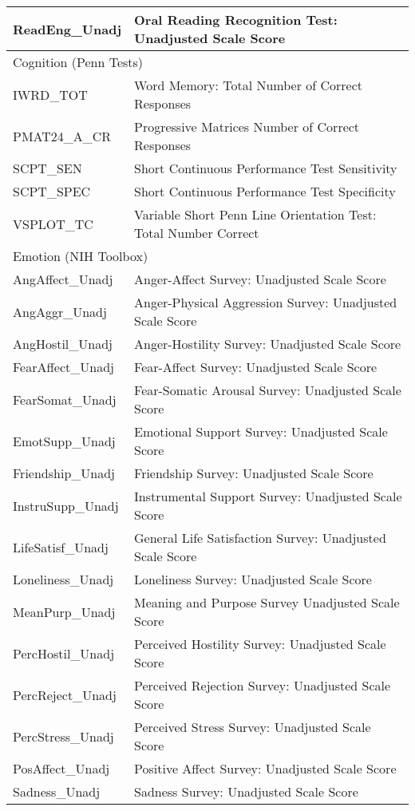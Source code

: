 \documentclass{article}
\begin{document}
\begin{longtable}{ll}
ReadEng\_Unadj & Oral Reading Recognition Test: Unadjusted Scale Score\\
\midrule
\multicolumn{2}{l}{Cognition (Penn Tests)}\\
\midrule
IWRD\_TOT & Word Memory: Total Number of Correct Responses\\
PMAT24\_A\_CR & Progressive Matrices\: Number of Correct Responses\\
SCPT\_SEN & Short Continuous Performance Test\: Sensitivity\\
SCPT\_SPEC & Short Continuous Performance Test\: Specificity\\
VSPLOT\_TC & Variable Short Penn Line Orientation Test: Total Number Correct \\
\midrule
\multicolumn{2}{l}{Emotion (NIH Toolbox)}\\
\midrule
AngAffect\_Unadj & Anger-Affect Survey: Unadjusted Scale Score\\
AngAggr\_Unadj & Anger-Physical Aggression Survey: Unadjusted Scale Score\\
AngHostil\_Unadj & Anger-Hostility Survey: Unadjusted Scale Score\\
FearAffect\_Unadj & Fear-Affect Survey: Unadjusted Scale Score\\
FearSomat\_Unadj & Fear-Somatic Arousal Survey: Unadjusted Scale Score \\
EmotSupp\_Unadj & Emotional Support Survey: Unadjusted Scale Score\\
Friendship\_Unadj & Friendship Survey: Unadjusted Scale Score\\
InstruSupp\_Unadj & Instrumental Support Survey: Unadjusted Scale Score \\
LifeSatisf\_Unadj & General Life Satisfaction Survey: Unadjusted Scale Score\\
Loneliness\_Unadj & Loneliness Survey: Unadjusted Scale Score\\
MeanPurp\_Unadj & Meaning and Purpose Survey\: Unadjusted Scale Score\\
PercHostil\_Unadj & Perceived Hostility Survey: Unadjusted Scale Score\\
PercReject\_Unadj & Perceived Rejection Survey: Unadjusted Scale Score\\
PercStress\_Unadj & Perceived Stress Survey: Unadjusted Scale Score\\
PosAffect\_Unadj & Positive Affect Survey: Unadjusted Scale Score\\
Sadness\_Unadj & Sadness Survey: Unadjusted Scale Score\\

\end{longtable}
\end{document}
